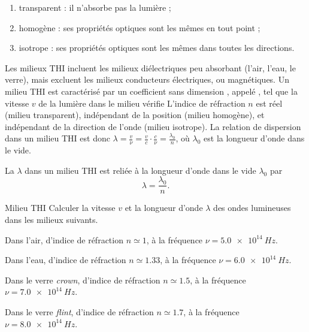 \documentclass[12pt,fancy]{cours}
\begin{document}
\begin{liste}
  \begin{enumerate}
    \item transparent : il n'absorbe pas la lumière ;
    \item homogène : ses propriétés optiques sont les mêmes en tout point ;
    \item isotrope : ses propriétés optiques sont les mêmes dans toutes les directions.
  \end{enumerate}
  Les milieux THI incluent les milieux diélectriques peu absorbant (l'air, l'eau, le verre), mais excluent les milieux conducteurs électriques, ou magnétiques.
  Un milieu THI
  est caractérisé par un coefficient sans dimension , appelé , tel que la vitesse $v$ de la lumière dans le milieu vérifie
    L'indice de réfraction $n$ est réel (milieu transparent), indépendant de la position (milieu homogène), et indépendant de la direction de l'onde (milieu isotrope).
    La relation de dispersion dans un milieu THI est donc  $\lambda = \frac{v}{\nu} = \frac{v}{c} \cdot \frac{c}{\nu} = \frac{\lambda_0}{n}$, où $\lambda_0$ est la longueur d'onde dans le vide.
    \begin{prop}\label{prop:}
      La  $\lambda$ dans un milieu THI est reliée à la longueur d'onde dans le vide $\lambda_0$ par
      $$
      \lambda = \frac{\lambda_0}{n}.
      $$
    \end{prop}
  \end{liste}

\begin{exemple}{Milieu THI}
  Calculer la vitesse $v$  et la longueur d'onde $\lambda$ des ondes lumineuses dans les milieux suivants.
  \begin{quest}
    \item	Dans l'air, d'indice de réfraction $n\simeq 1$, à la fréquence $\nu = \SI{5.0e14}{Hz}$.
    \item Dans l'eau, d'indice de réfraction $n\simeq \num{1.33}$, à la fréquence $\nu = \SI{6.0e14}{Hz}$.
    \item Dans le verre \emph{crown}, d'indice de réfraction  $n\simeq \num{1.5}$, à la fréquence $\nu = \SI{7.0e14}{Hz}$.
    \item Dans le verre \emph{flint}, d'indice de réfraction  $n \simeq \num{1.7}$, à la fréquence $\nu = \SI{8.0e14}{Hz}$.
  \end{quest}
\end{exemple}
\examplesol{}
\end{document}
